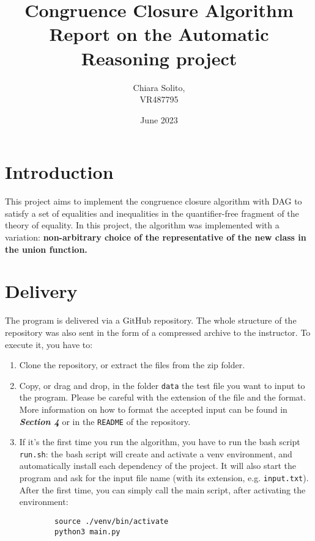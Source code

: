\documentclass[11pt]{article}
\title{\Huge Congruence Closure Algorithm \\ \Large Report on the Automatic Reasoning project}
\date{June 2023}
\author{Chiara Solito,\\VR487795}
\begin{document}
\maketitle

\section{Introduction}
This project aims to implement the congruence closure algorithm with DAG to satisfy a set of equalities and inequalities in the quantifier-free fragment of the theory of equality. In this project, the algorithm was implemented with a variation: \textbf{non-arbitrary choice of the representative of the new class in the union function.}

\section{Delivery}
The program is delivered via a GitHub repository. The whole structure of the repository was also sent in the form of a compressed archive to the instructor. To execute it, you have to:
\begin{enumerate}
    \item Clone the repository, or extract the files from the zip folder.
    \item Copy, or drag and drop, in the folder \texttt{data} the test file you want to input to the program. Please be careful with the extension of the file and the format. \\ More information on how to format the accepted input can be found in \textit{\textbf{Section 4}} or in the \texttt{README} of the repository.
    \item If it's the first time you run the algorithm, you have to run the bash script \texttt{run.sh}: the bash script will create and activate a venv environment, and automatically install each dependency of the project. It will also start the program and ask for the input file name (with its extension, e.g. \texttt{input.txt}).\\
    After the first time, you can simply call the main script, after activating the environment:
    \begin{verbatim}
        source ./venv/bin/activate
        python3 main.py
    \end{verbatim}
    
\end{enumerate}
\end{document}
